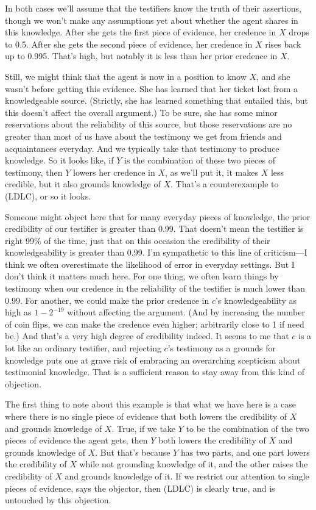 \noindent In both cases we'll assume that the testifiers know the truth of their assertions, though we won't make any assumptions yet about whether the agent shares in this knowledge. After she gets the first piece of evidence, her credence in $X$ drops to 0.5. After she gets the second piece of evidence, her credence in $X$ rises back up to 0.995. That's high, but notably it is less than her prior credence in $X$. 

Still, we might think that the agent is now in a position to know $X$, and she wasn't before getting this evidence. She has learned that her ticket lost from a knowledgeable source. (Strictly, she has learned something that entailed this, but this doesn't affect the overall argument.) To be sure, she has some minor reservations about the reliability of this source, but those reservations are no greater than most of us have about the testimony we get from friends and acquaintances everyday. And we typically take that testimony to produce knowledge. So it looks like, if $Y$ is the combination of these two pieces of testimony, then $Y$ lowers her credence in $X$, as we'll put it, it makes $X$ less credible, but it also grounds knowledge of $X$. That's a counterexample to (LDLC), or so it looks.

Someone might object here that for many everyday pieces of knowledge, the prior credibility of our testifier is greater than 0.99. That doesn't mean the testifier is right 99\% of the time, just that on this occasion the credibility of their knowledgeability is greater than 0.99. I'm sympathetic to this line of criticism---I think we often overestimate the likelihood of error in everyday settings. But I don't think it matters much here. For one thing, we often learn things by testimony when our credence in the reliability of the testifier  is much lower than 0.99. For another, we could make the prior credence in $c$'s knowledgeability as high as $1 - 2^{-19}$ without affecting the argument. (And by increasing the number of coin flips, we can make the credence even higher; arbitrarily close to 1 if need be.) And that's a very high degree of credibility indeed. It seems to me that $c$ is a lot like an ordinary testifier, and rejecting $c$'s testimony as a grounds for knowledge puts one at grave risk of embracing an overarching scepticism about testimonial knowledge. That is a sufficient reason to stay away from this kind of objection.

The first thing to note about this example is that what we have here is a case where there is no single piece of evidence that both lowers the credibility of $X$ and grounds knowledge of $X$. True, if we take $Y$ to be the combination of the two pieces of evidence the agent gets, then $Y$ both lowers the credibility of $X$ and grounds knowledge of $X$. But that's because $Y$ has two parts, and one part lowers the credibility of $X$ while not grounding knowledge of it, and the other raises the credibility of $X$ and grounds knowledge of it. If we restrict our attention to single pieces of evidence, says the objector, then (LDLC) is clearly true, and is untouched by this objection.

